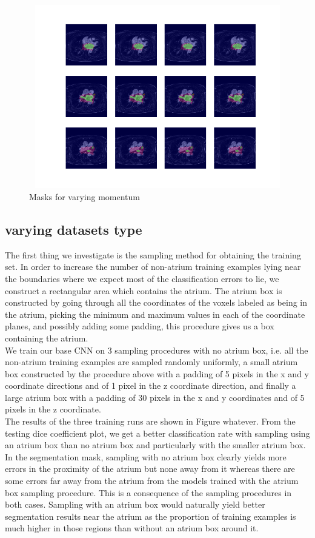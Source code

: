 \begin{figure}
\centering
\includegraphics[trim=2.5cm 1.5cm 2cm 1.5cm, clip=true, height=80mm, width=150mm]{Chapter3/mask_results_varying_momentum.png}
\caption{Masks for varying momentum}
\end{figure}



\subsection{varying datasets type}

\noindent The first thing we investigate is the sampling method for obtaining the training set. In order to increase the number of non-atrium training examples lying near the boundaries where we expect most of the classification errors to lie, we construct a rectangular area which contains the atrium. The atrium box is constructed by going through all the coordinates of the voxels labeled as being in the atrium, picking the minimum and maximum values in each of the coordinate planes, and possibly adding some padding, this procedure gives us a box containing the atrium. \\

\noindent We train our base CNN on 3 sampling procedures with no atrium box, i.e. all the non-atrium training examples are sampled randomly uniformly, a small atrium box constructed by the procedure above with a padding of 5 pixels in the x and y coordinate directions and of 1 pixel in the z coordinate direction, and finally a large atrium box with a padding of 30 pixels in the x and y coordinates and of 5 pixels in the z coordinate.\\

\noindent The results of the three training runs are shown in Figure whatever. From the testing dice coefficient plot, we get a better classification rate with sampling using an atrium box than no atrium box and particularly with the smaller atrium box. In the segmentation mask, sampling with no atrium box clearly yields more errors in the proximity of the atrium but none away from it whereas there are some errors far away from the atrium from the models trained with the atrium box sampling procedure. This is a consequence of the sampling procedures in both cases. Sampling with an atrium box would naturally yield better segmentation results near the atrium as the proportion of training examples is much higher in those regions than without an atrium box around it.\\

